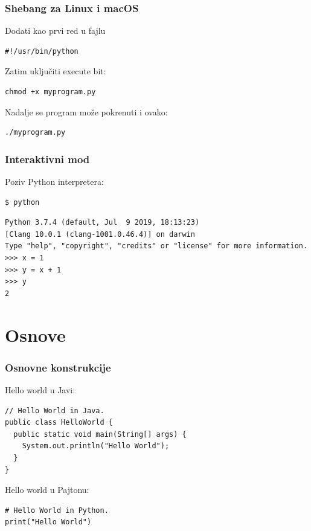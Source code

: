 \documentclass[compress]{beamer}
\begin{document}
\begin{frame}[fragile]
\frametitle{Shebang za Linux i macOS}

Dodati kao prvi red u fajlu

\begin{verbatim}
#!/usr/bin/python
\end{verbatim}

Zatim uključiti execute bit:

\begin{verbatim}
chmod +x myprogram.py
\end{verbatim}

Nadalje se program može pokrenuti i ovako:

\begin{verbatim}
./myprogram.py
\end{verbatim}  
\end{frame}

\begin{frame}[fragile]
\frametitle{Interaktivni mod}
Poziv Python interpretera:
\begin{verbatim}
$ python
\end{verbatim}
\begin{verbatim}
Python 3.7.4 (default, Jul  9 2019, 18:13:23) 
[Clang 10.0.1 (clang-1001.0.46.4)] on darwin
Type "help", "copyright", "credits" or "license" for more information.
>>> x = 1
>>> y = x + 1
>>> y
2 
\end{verbatim}
\end{frame}

\section{Osnove}

\begin{frame}[fragile]
\frametitle{Osnovne konstrukcije}
Hello world u Javi:
\begin{verbatim}
// Hello World in Java.
public class HelloWorld {
  public static void main(String[] args) {
    System.out.println("Hello World");
  }
}
\end{verbatim}

Hello world u Pajtonu:

\begin{verbatim}
# Hello World in Python.
print("Hello World")
\end{verbatim}
\end{frame}
\end{document}
